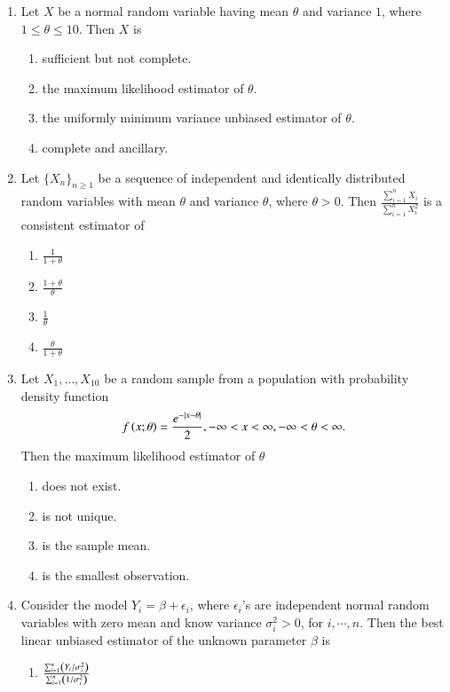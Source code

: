 \documentclass[journal]{IEEEtran}
\begin{document}
\begin{enumerate}
	\item Let $X$ be a normal random variable having mean $\theta$ and variance $1$, where $1 \leq \theta \leq 10$. Then $X$ is
		\begin{enumerate}
			\item sufficient but not complete.
			\item the maximum likelihood estimator of $\theta$.
			\item the uniformly minimum variance unbiased estimator of $\theta$.
			\item complete and ancillary.
		\end{enumerate}
	\item Let $\{X_n\}_{n \geq 1}$ be a sequence of independent and identically distributed random variables with mean $\theta$ and variance $\theta$, where $\theta > 0$. Then $\frac{\sum_{i=1}^{n} X_i}{\sum_{i=1}^{n} X_i^2}$ is a consistent estimator of
		\begin{enumerate}
			\item $\frac{1}{1+\theta}$
			\item $\frac{1+\theta}{\theta}$
			\item $\frac{1}{\theta}$
			\item $\frac{\theta}{1+\theta}$
		\end{enumerate}
	\item Let $X_1, \dots, X_{10}$ be a random sample from a population with probability density function 
		\begin{align*}
			f\left(x; \theta\right) = \frac{e^{-\left\vert x - \theta\right\vert}}{2}, -\infty < x < \infty, -\infty < \theta < \infty.
		\end{align*}
		Then the maximum likelihood estimator of $\theta$
		\begin{enumerate}
			\item does not exist.
			\item is not unique.
			\item is the sample mean.
			\item is the smallest observation.
		\end{enumerate}
	\item Consider the model $Y_i = \beta + \epsilon_i$, where $\epsilon_i$'s are independent normal random variables with zero mean and know variance $\sigma_i^2>0$, for $i, \cdots, n$. Then the best linear unbiased estimator of the unknown parameter $\beta$ is
		\begin{enumerate}
			\item $\frac{\sum_{i=1}^{n}\left(Y_i/\sigma_i^2\right)}{\sum_{i=1}^{n}\left(1/\sigma_i^2\right)}$

\end{enumerate}
\end{enumerate}
\end{document}
